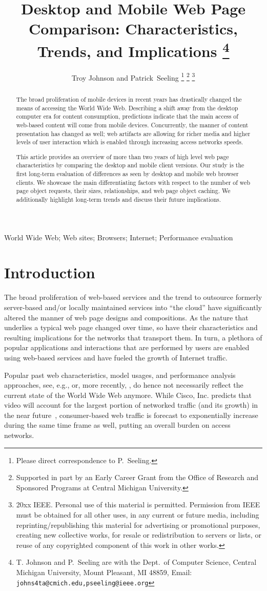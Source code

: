 \documentclass[onecolumn,12pt]{IEEEtran}
\title{Desktop and Mobile Web Page Comparison: Characteristics, Trends, and Implications
	\thanks{T. Johnson and P.~Seeling are with the Dept.~of Computer Science,
		Central Michigan University, Mount Pleasant, MI 48859, Email: \texttt{johns4ta@cmich.edu,pseeling@ieee.org}}
}
\author{Troy Johnson and Patrick~Seeling
	\thanks{Please direct correspondence to P.~Seeling.}
	\thanks{Supported in part by an Early Career Grant from the Office of Research and Sponsored Programs at Central Michigan University.}
	\thanks{\textcopyright 20xx IEEE. Personal use of this material is permitted. Permission from IEEE must be obtained for all other uses, in any current or future media, including reprinting/republishing this material for advertising or promotional purposes, creating new collective works, for resale or redistribution to servers or lists, or reuse of any copyrighted component of this work in other works.}
}
\begin{document}
\maketitle

\begin{abstract}\boldmath
The broad proliferation of mobile devices in recent years has drastically changed the means of accessing the World Wide Web.
Describing a shift away from the desktop computer era for content consumption, predictions indicate that the main access of web-based content will come from mobile devices.
Concurrently, the manner of content presentation has changed as well; web artifacts are allowing for richer media and higher levels of user interaction which is enabled through increasing access networks speeds.

This article provides an overview of more than two years of high level web page characteristics by comparing the desktop and mobile client versions.
Our study is the first long-term evaluation of differences as seen by desktop and mobile web browser clients.
We showcase the main differentiating factors with respect to the number of web page object requests, their sizes, relationships, and web page object caching.
We additionally highlight long-term trends and discuss their future implications.

\end{abstract}

\begin{IEEEkeywords}
World Wide Web; Web sites; Browsers; Internet; Performance evaluation
\end{IEEEkeywords}


\section{Introduction} 
\label{s:intro}

The broad proliferation of web-based services and the trend to outsource formerly server-based and/or locally maintained services into ``the cloud'' have significantly altered the manner of web page designs and compositions.
As the nature that underlies a typical web page changed over time, so have their characteristics and resulting implications for the networks that transport them.
In turn, a plethora of popular applications and interactions that are performed by users are enabled using web-based services and have fueled the growth of Internet traffic.

Popular past web characteristics, model usages, and performance analysis approaches, see, e.g., \cite{BaCr98} or, more recently, \cite{LiZhZhChGr10}, do hence not necessarily reflect the current state of the World Wide Web anymore.
While Cisco, Inc. predicts that video will account for the largest portion of networked traffic (and its growth) in the near future~\cite{Ci13}, consumer-based web traffic is forecast to exponentially increase during the same time frame as well, putting an overall burden on access networks.
\end{document}

